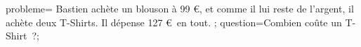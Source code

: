 \documentclass[exercice]{thedocument}%
\begin{document}
%
    \>probleme={%
        Bastien achète un blouson à 99 \euro, et comme il lui reste de l'argent,
        il achète deux T-Shirts. Il dépense 127 \euro \ en tout.%
    };%
    \>question=Combien coûte un T-Shirt~?;%
\end{document}
